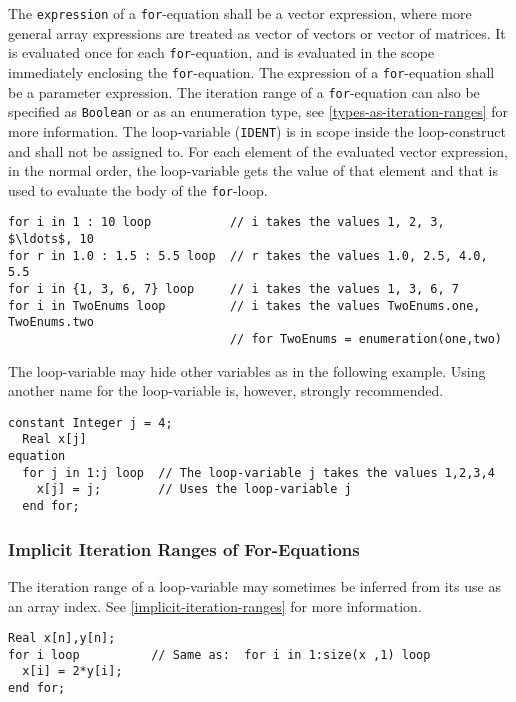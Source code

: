 The \lstinline!expression! of a \lstinline!for!-equation shall be a vector expression, where more general array expressions are treated as vector of vectors or vector of matrices.
It is evaluated once for each \lstinline!for!-equation, and is evaluated in the scope immediately enclosing the \lstinline!for!-equation.
The expression of a \lstinline!for!-equation shall be a parameter expression.
The iteration range of a \lstinline!for!-equation can also be specified as \lstinline!Boolean! or as an enumeration type, see \cref{types-as-iteration-ranges} for more information.
The loop-variable (\lstinline!IDENT!) is in scope inside the loop-construct and shall not be assigned to.
For each element of the evaluated vector expression, in the normal order, the loop-variable gets the value of that element and that is used to evaluate the body of the \lstinline!for!-loop.

\begin{example}
\begin{lstlisting}[language=modelica]
for i in 1 : 10 loop           // i takes the values 1, 2, 3, $\ldots$, 10
for r in 1.0 : 1.5 : 5.5 loop  // r takes the values 1.0, 2.5, 4.0, 5.5
for i in {1, 3, 6, 7} loop     // i takes the values 1, 3, 6, 7
for i in TwoEnums loop         // i takes the values TwoEnums.one, TwoEnums.two
                               // for TwoEnums = enumeration(one,two)
\end{lstlisting}

The loop-variable may hide other variables as in the following example.
Using another name for the loop-variable is, however, strongly recommended.
\begin{lstlisting}[language=modelica]
  constant Integer j = 4;
  Real x[j]
equation
  for j in 1:j loop  // The loop-variable j takes the values 1,2,3,4
    x[j] = j;        // Uses the loop-variable j
  end for;
\end{lstlisting}
\end{example}


\subsubsection{Implicit Iteration Ranges of For-Equations}\label{implicit-iteration-ranges-of-for-equations}

The iteration range of a loop-variable may sometimes be inferred from its use as an array index.
See \cref{implicit-iteration-ranges} for more information.

\begin{example}
\begin{lstlisting}[language=modelica]
  Real x[n],y[n];
for i loop          // Same as:  for i in 1:size(x ,1) loop
  x[i] = 2*y[i];
end for;
\end{lstlisting}
\end{example}

